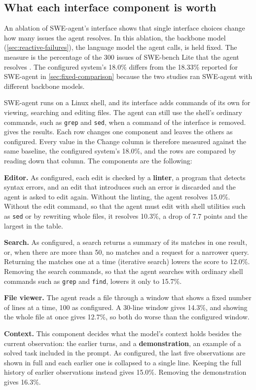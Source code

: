 \subsection{What each interface component is worth}
\label{sec:boundary-ablation}

An ablation of SWE-agent's interface shows that single interface choices change how many issues the
agent resolves. In this ablation, the backbone model (\cref{sec:reactive-failures}), the language model the
agent calls, is held fixed. The measure is the percentage of the 300 issues of SWE-bench Lite that
the agent resolves \citep[Table~3]{yang2024sweagent}. The configured system's 18.0\% differs from
the 18.33\% reported for SWE-agent in \cref{sec:fixed-comparison} because the two studies ran
SWE-agent with different backbone models.

SWE-agent runs on a Linux shell, and its interface adds commands of its own for viewing, searching
and editing files. The agent can still use the shell's ordinary commands, such as \texttt{grep} and
\texttt{sed}, when a command of the interface is removed.  gives the
results. Each row changes one component and leaves the others
as configured. Every value in the Change column is therefore measured against the same baseline, the
configured system's 18.0\%, and the rows are compared by reading down that column. The components
are the following:
\bi
\item \textbf{Editor.} As configured, each edit is checked by a \textbf{linter}, a program that
detects syntax errors, and an edit that introduces such an error is discarded and the agent is
asked to edit again. Without the linting, the agent resolves 15.0\%. Without the edit command, so
that the agent must edit with shell utilities such as \texttt{sed} or by rewriting whole files, it
resolves 10.3\%, a drop of 7.7 points and the largest in the table.
\item \textbf{Search.} As configured, a search returns a summary of its matches in one result, or,
when there are more than 50, no matches and a request for a narrower query. Returning the matches
one at a time (iterative search) lowers the score to 12.0\%. Removing the search commands, so that
the agent searches with ordinary shell commands such as \texttt{grep} and \texttt{find}, lowers it
only to 15.7\%.
\item \textbf{File viewer.} The agent reads a file through a window that shows a fixed number of
lines at a time, 100 as configured. A 30-line window gives 14.3\%, and showing the whole file at
once gives 12.7\%, so both do worse than the configured window.
\item \textbf{Context.} This component decides what the model's context holds besides the current
observation: the earlier turns, and a \textbf{demonstration}, an example of a solved task included in
the prompt. As configured, the last five observations are shown in full and each earlier one is
collapsed to a single line. Keeping the full history of earlier observations instead gives 15.0\%.
Removing the demonstration gives 16.3\%.
\ei

